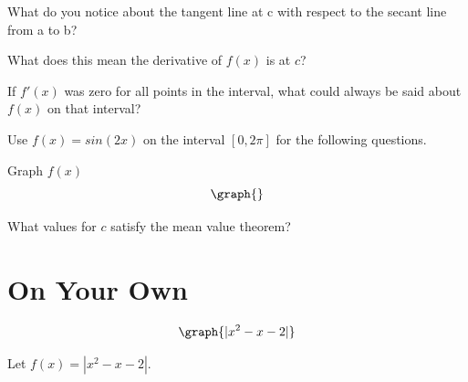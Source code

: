 \documentclass{ximera}
\begin{document}
\begin{question}
What do you notice about the tangent line at c with respect to the secant line from a to b?

\begin{multipleChoice}
\end{multipleChoice}

What does this mean the derivative of $f(x)$ is at $c$?

\begin{multipleChoice}
\end{multipleChoice}

If $f'(x)$ was zero for all points in the interval, what could always be said about $f(x)$ on that interval?
\begin{multipleChoice}
\end{multipleChoice}

\end{question}
\begin{question}
Use $f(x)=sin(2x)$ on the interval $[0,2\pi]$ for the following questions.

Graph $f(x)$
\[
\graph{}
\]

What values for $c$ satisfy the mean value theorem?

\begin{selectAll}
\choice{$\pi$}
\end{selectAll}

\end{question}

\section{On Your Own}

\[
\graph{|x^2-x-2|}
\]

Let $f(x)=\left|x^2-x-2\right|$.
\end{document}
